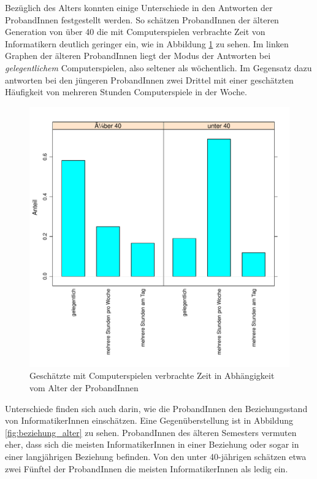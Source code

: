 \documentclass[de]{agse-empir-report}\usepackage[]{graphicx}\usepackage[]{color}
\newenvironment{knitrout}{}{} %
\begin{document}
Bez\"uglich des Alters konnten einige Unterschiede in den Antworten der ProbandInnen festgestellt werden. So sch\"atzen ProbandInnen der \"alteren Generation von \"uber 40 die mit Computerspielen verbrachte Zeit von Informatikern deutlich geringer ein, wie in Abbildung \ref{fig:games_alter} zu sehen. Im linken Graphen der \"alteren ProbandInnen liegt der Modus der Antworten bei \emph{gelegentlichem} Computerspielen, also seltener als w\"ochentlich. Im Gegensatz dazu antworten bei den j\"ungeren ProbandInnen zwei Drittel mit einer gesch\"atzten H\"aufigkeit von mehreren Stunden Computerspiele in der Woche.  

\begin{figure}
\begin{knitrout}
\color{fgcolor}
\includegraphics[width=\linewidth]{figure/chart_age-games-1} 

\end{knitrout}
    \caption{Gesch\"atzte mit Computerspielen verbrachte Zeit in Abh\"angigkeit vom Alter der ProbandInnen}
    \label{fig:games_alter}
\end{figure}

Unterschiede finden sich auch darin, wie die ProbandInnen den Beziehungsstand von InformatikerInnen einschätzen. Eine Gegen\"uberstellung ist in Abbildung \ref{fig:beziehung_alter} zu sehen. ProbandInnen des \"alteren Semesters vermuten eher, dass sich die meisten InformatikerInnen in einer Beziehung oder sogar in einer langj\"ahrigen Beziehung befinden. Von den unter 40-j\"ahrigen sch\"atzen etwa zwei F\"unftel der ProbandInnen die meisten InformatikerInnen als ledig ein.
\end{document}
